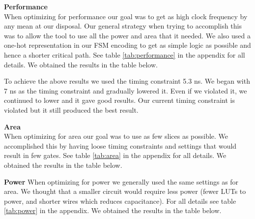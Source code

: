 \documentclass[a4paper,11pt]{article}
\begin{document}
\textbf{Performance} \\
When optimizing for performance our goal was to get as high clock frequency by any mean at our disposal. Our general strategy when trying to accomplish this was to allow the tool to use all the power and area that it needed. We also used a one-hot representation in our FSM encoding to get as simple logic as possible and hence a shorter critical path. See table \ref{tab:performance} in the appendix for all details. We obtained the results in the table below. 


To achieve the above results we used the timing constraint 5.3 ns. We began with 7 ns as the timing constraint and gradually lowered it. Even if we violated it, we continued to lower and it gave good results. Our current timing constraint is violated but it still produced the best result.

\textbf{Area}\\
When optimizing for area our goal was to use as few slices as possible. We accomplished this by having loose timing constraints and settings that would result in few gates. See table \ref{tab:area} in the appendix for all details. We obtained the results in the table below.


\textbf{Power}
When optimizing for power we generally used the same settings as for area. We thought that a smaller circuit would require less power (fewer LUTs to power, and shorter wires which reduces capacitance). For all details see table \ref{tab:power} in the appendix. We obtained the results in the table below.
\end{document}
